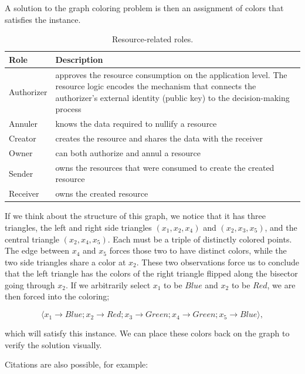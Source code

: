 A solution to the graph coloring problem is then an assignment of colors that
satisfies the instance. 


\begin{table}[!h]
\begin{center}
\begin{tabular}{p{1.5cm}p{13cm}}
\toprule
  \textbf{Role} & \textbf{Description} \\
\midrule
  Authorizer & approves the resource consumption on the application level. The
  resource logic encodes the mechanism that connects the authorizer's external
  identity (public key) to the decision-making process \\
  Annuler & knows the data required to nullify a resource \\
  Creator & creates the resource and shares the data with the receiver \\
  Owner & can both authorize and annul a resource \\
  Sender & owns the resources that were consumed to create the created resource
  \\
  Receiver & owns the created resource \\
\bottomrule
\end{tabular}
\caption{Resource-related roles.}
\end{center}
\end{table}


If we think about the structure of this graph, we notice that it has three
triangles, the left and right side triangles $(x_1, x_2, x_4)$  and $(x_2, x_3,
x_5)$, and the central triangle $(x_2, x_4, x_5)$. Each must be a triple of
distinctly colored points. The edge between $x_4$ and $x_5$ forces those two to
have distinct colors, while the two side triangles share a color at $x_2$. These
two observations force us to conclude that the left triangle has the colors of
the right triangle flipped along the bisector going through $x_2$. If we
arbitrarily select $x_1$ to be $\mathit{Blue}$ and $x_2$ to be $\mathit{Red}$,
we are then forced into the coloring;

\begin{equation}
 \langle x_1 \rightarrow \mathit{Blue}; x_2 \rightarrow \mathit{Red}; x_3 \rightarrow \mathit{Green}; x_4 \rightarrow \mathit{Green}; x_5 \rightarrow \mathit{Blue}\rangle,
\end{equation}

which will satisfy this instance. We can place these colors back on the graph to
verify the solution visually.

Citations are also possible, for example: \citep{christopher_goes_2023_8279842}
